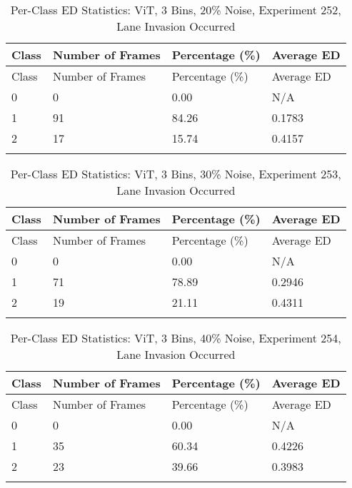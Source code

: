
\begin{longtable}{@{}llll@{}}
\toprule
Class & Number of Frames & Percentage (\%) & Average ED \\
\midrule
\endfirsthead
\toprule
Class & Number of Frames & Percentage (\%) & Average ED \\
\midrule
\endhead
0 & 0 & 0.00 & N/A \\
1 & 91 & 84.26 & 0.1783 \\
2 & 17 & 15.74 & 0.4157 \\
\bottomrule
\caption{Per-Class ED Statistics: ViT, 3 Bins, 20\% Noise, Experiment 252, Lane Invasion Occurred}
\label{tab:exp252_ViT_3bins_20noise}
\end{longtable}
        


\begin{longtable}{@{}llll@{}}
\toprule
Class & Number of Frames & Percentage (\%) & Average ED \\
\midrule
\endfirsthead
\toprule
Class & Number of Frames & Percentage (\%) & Average ED \\
\midrule
\endhead
0 & 0 & 0.00 & N/A \\
1 & 71 & 78.89 & 0.2946 \\
2 & 19 & 21.11 & 0.4311 \\
\bottomrule
\caption{Per-Class ED Statistics: ViT, 3 Bins, 30\% Noise, Experiment 253, Lane Invasion Occurred}
\label{tab:exp253_ViT_3bins_30noise}
\end{longtable}
        


\begin{longtable}{@{}llll@{}}
\toprule
Class & Number of Frames & Percentage (\%) & Average ED \\
\midrule
\endfirsthead
\toprule
Class & Number of Frames & Percentage (\%) & Average ED \\
\midrule
\endhead
0 & 0 & 0.00 & N/A \\
1 & 35 & 60.34 & 0.4226 \\
2 & 23 & 39.66 & 0.3983 \\
\bottomrule
\caption{Per-Class ED Statistics: ViT, 3 Bins, 40\% Noise, Experiment 254, Lane Invasion Occurred}
\label{tab:exp254_ViT_3bins_40noise}
\end{longtable}
        

